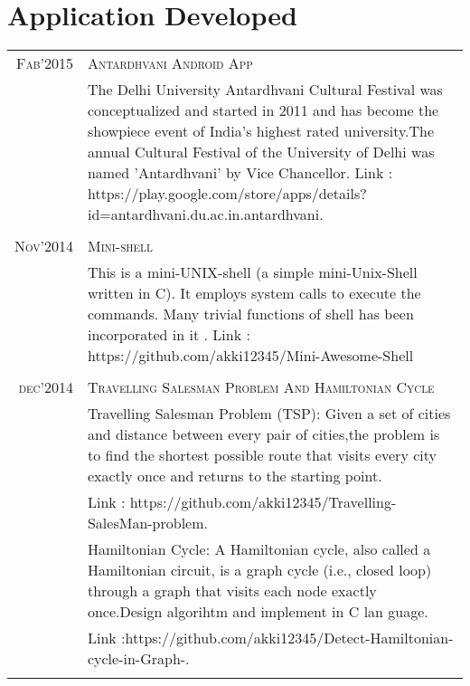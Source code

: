 \documentclass[a4paper,10pt]{article}
\begin{document}
\section{Application Developed}
\begin{tabular}{r|p{11cm}}
\textsc{Fab'2015} & \textsc{Antardhvani Android App}\\&\footnotesize{The Delhi University Antardhvani Cultural Festival was conceptualized and started in 2011 and has become the showpiece event of India’s highest rated university.The annual Cultural Festival of the University of Delhi was named ’Antardhvani’ by Vice Chancellor.
Link : https://play.google.com/store/apps/details?id=antardhvani.du.ac.in.antardhvani.}\\\\
\textsc{Nov'2014} & \textsc{Mini-shell}\\&\footnotesize{This is a mini-UNIX-shell (a simple mini-Unix-Shell written in C). It employs system calls to execute the commands. Many trivial functions of shell has been incorporated in it   .
Link : https://github.com/akki12345/Mini-Awesome-Shell}\\\\
\textsc{dec'2014} & \textsc{Travelling Salesman Problem And Hamiltonian Cycle}\\&\footnotesize{Travelling Salesman Problem (TSP): Given a set of cities and distance between every pair of cities,the problem is to find the shortest possible route that visits every city exactly once and returns to the starting point.}
\\&\footnotesize{Link : https://github.com/akki12345/Travelling-SalesMan-problem.}
\\&\footnotesize{Hamiltonian Cycle: A Hamiltonian cycle, also called a Hamiltonian circuit, is a graph cycle (i.e., closed loop) through a graph that visits each node exactly once.Design algorihtm and implement in C lan
guage.}
\\&\footnotesize{Link :https://github.com/akki12345/Detect-Hamiltonian-cycle-in-Graph-.}\\\\
\end{tabular}
\end{document}
